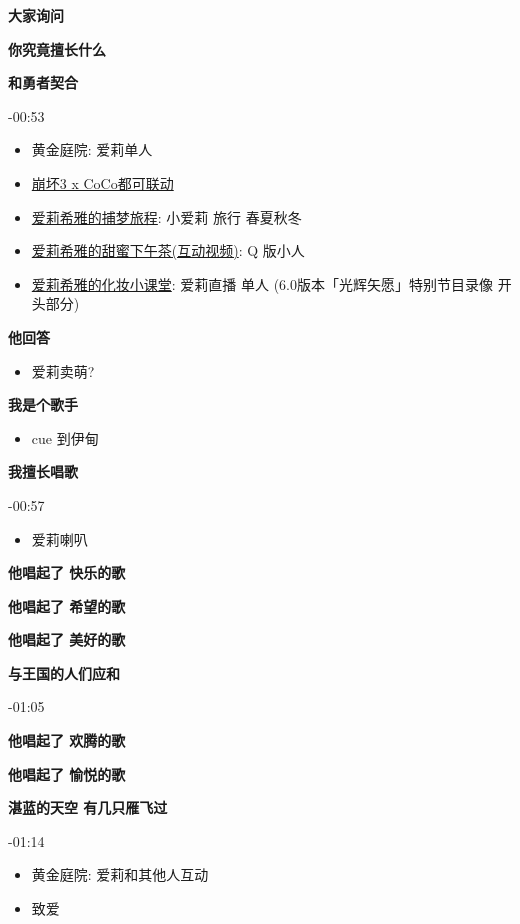 \documentclass[a4paper]{article}
\begin{document}
\textbf{大家询问}

\textbf{你究竟擅长什么}

\textbf{和勇者契合}

-00:53

\begin{itemize}
    \item 黄金庭院: 爱莉单人
    \item \href{https://www.bilibili.com/video/BV1j84y1D7uf/}{崩坏3 x CoCo都可联动}
    \item \href{https://www.bilibili.com/video/BV1ZW4y1t7Zf/}{爱莉希雅的捕梦旅程}: 小爱莉 旅行 春夏秋冬
    \item \href{https://www.bilibili.com/video/BV1Ta411Z7KE/}{爱莉希雅的甜蜜下午茶(互动视频)}: Q 版小人
    \item \href{https://www.bilibili.com/video/BV12T411w7CN/}{爱莉希雅的化妆小课堂}: 爱莉直播 单人 (6.0版本「光辉矢愿」特别节目录像 开头部分)
\end{itemize}

\textbf{他回答}

\begin{itemize}
    \item 爱莉卖萌?
\end{itemize}

\textbf{我是个歌手}

\begin{itemize}
    \item cue 到伊甸
\end{itemize}

\textbf{我擅长唱歌}

-00:57

\begin{itemize}
    \item 爱莉喇叭
\end{itemize}

\textbf{他唱起了 快乐的歌}

\textbf{他唱起了 希望的歌}

\textbf{他唱起了 美好的歌}

\textbf{与王国的人们应和}

-01:05

\textbf{他唱起了 欢腾的歌}

\textbf{他唱起了 愉悦的歌}

\textbf{湛蓝的天空 有几只雁飞过}

-01:14

\begin{itemize}
    \item 黄金庭院: 爱莉和其他人互动
    \item 致爱
\end{itemize}
\end{document}
